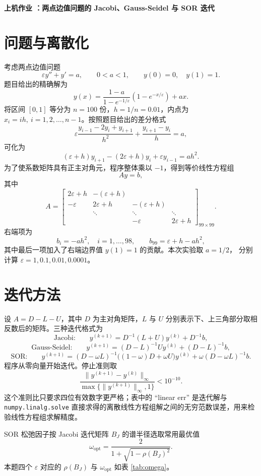 \documentclass[a4paper,11pt]{article}
\begin{document}
\begin{center}
    \Large\textbf{上机作业 ：两点边值问题的 Jacobi、Gauss-Seidel 与 SOR 迭代}
\end{center}

\section{问题与离散化}
考虑两点边值问题
\[
    \varepsilon y''+y'=a,\qquad 0<a<1,\qquad y(0)=0,\quad y(1)=1.
\]
题目给出的精确解为
\[
    y(x)=\frac{1-a}{1-e^{-1/\varepsilon}}\left(1-e^{-x/\varepsilon}\right)+ax.
\]
将区间 $[0,1]$ 等分为 $n=100$ 份，$h=1/n=0.01$，内点为
$x_i=ih,\ i=1,2,\ldots,n-1$。按照题目给出的差分格式
\[
    \varepsilon\frac{y_{i-1}-2y_i+y_{i+1}}{h^2}
    +\frac{y_{i+1}-y_i}{h}=a,
\]
可化为
\[
    (\varepsilon+h)y_{i+1}-(2\varepsilon+h)y_i+\varepsilon y_{i-1}=ah^2.
\]
为了使系数矩阵具有正主对角元，程序整体乘以 $-1$，得到等价线性方程组
\[
    Ay=b,
\]
其中
\[
    A=\begin{bmatrix}
    2\varepsilon+h & -(\varepsilon+h) \\
    -\varepsilon & 2\varepsilon+h & -(\varepsilon+h) \\
    & \ddots & \ddots & \ddots \\
    &&-\varepsilon&2\varepsilon+h
    \end{bmatrix}_{99\times99}.
\]
右端项为
\[
    b_i=-ah^2,\quad i=1,\ldots,98,\qquad
    b_{99}=\varepsilon+h-ah^2,
\]
其中最后一项加入了右端边界值 $y(1)=1$ 的贡献。本次实验取 $a=1/2$，
分别计算 $\varepsilon=1,0.1,0.01,0.0001$。

\section{迭代方法}
设 $A=D-L-U$，其中 $D$ 为主对角矩阵，$L$ 与 $U$ 分别表示下、上三角部分取相反数后的矩阵。三种迭代格式为
\[
    \text{Jacobi:}\qquad
    y^{(k+1)}=D^{-1}(L+U)y^{(k)}+D^{-1}b,
\]
\[
    \text{Gauss-Seidel:}\qquad
    y^{(k+1)}=(D-L)^{-1}Uy^{(k)}+(D-L)^{-1}b,
\]
\[
    \text{SOR:}\qquad
    y^{(k+1)}=(D-\omega L)^{-1}\bigl((1-\omega)D+\omega U\bigr)y^{(k)}
    +\omega(D-\omega L)^{-1}b.
\]
程序从零向量开始迭代。停止准则取
\[
    \frac{\|y^{(k+1)}-y^{(k)}\|_\infty}{\max\{\|y^{(k+1)}\|_\infty,1\}}<10^{-10}.
\]
这个准则比只要求四位有效数字更严格；表中的 ``linear err'' 是迭代解与
\verb|numpy.linalg.solve| 直接求得的离散线性方程组解之间的无穷范数误差，用来检验线性方程组求解精度。

SOR 松弛因子按 Jacobi 迭代矩阵 $B_J$ 的谱半径选取常用最优值
\[
    \omega_{\mathrm{opt}}=\frac{2}{1+\sqrt{1-\rho(B_J)^2}}.
\]
本题四个 $\varepsilon$ 对应的 $\rho(B_J)$ 与 $\omega_{\mathrm{opt}}$ 如表 \ref{tab:omega}。
\end{document}
